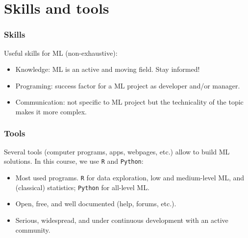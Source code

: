 \section{Skills and tools}
\begin{frame}
\frametitle{Skills}
Useful skills for ML (non-exhaustive):
\begin{itemize}
\item Knowledge: ML is an active and moving field. Stay informed!
\item Programing: success factor for a ML project as developer and/or manager. 
\item Communication: not specific to ML project but the technicality of the topic makes it more complex. 
\end{itemize}
\end{frame}
\begin{frame}
\frametitle{Tools}
Several tools (computer programs, apps, webpages, etc.) allow to build ML solutions. In this course, we use {\tt R} and {\tt Python}:
\begin{itemize}
\item Most used programs. {\tt R} for data exploration, low and medium-level ML, and (classical) statistics; {\tt Python} for all-level ML. 
\item Open, free, and well documented (help, forums, etc.).
\item Serious, widespread, and under continuous development with an active community.
\end{itemize}
\end{frame}

